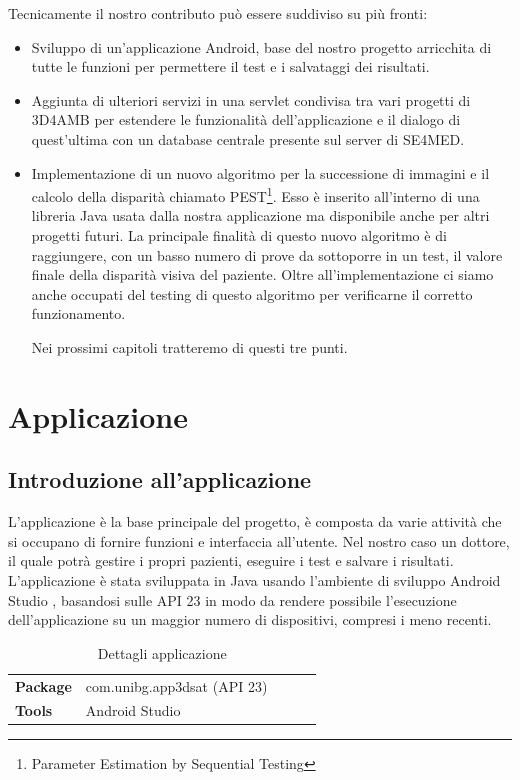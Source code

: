 \documentclass[
	corpo=12pt,
	twoside,
 	evenboxes,
	tipotesi=triennale,
    	stile=classica,
   	 greek,
]{toptesi}
\begin{document}
Tecnicamente il nostro contributo può essere suddiviso su più fronti:
\begin{itemize}
\item Sviluppo di un'applicazione Android, base del nostro progetto arricchita di tutte le funzioni per permettere il test e i salvataggi dei risultati.
\item Aggiunta di ulteriori servizi in una servlet condivisa tra vari progetti di 3D4AMB per estendere le funzionalità dell'applicazione e il dialogo di quest'ultima con un database centrale presente sul server di SE4MED.
\item Implementazione di un nuovo algoritmo per la successione di immagini e il calcolo della disparità chiamato PEST\footnote{Parameter Estimation by Sequential Testing}. Esso è inserito all'interno di una libreria Java usata dalla nostra applicazione ma disponibile anche per altri progetti futuri. La principale finalità di questo nuovo algoritmo è di raggiungere, con un basso numero di prove da sottoporre in un test, il valore finale della disparità visiva del paziente. Oltre all'implementazione ci siamo anche occupati del testing di questo algoritmo per verificarne il corretto funzionamento.

Nei prossimi capitoli tratteremo di questi tre punti.
\end{itemize}

\vfill

\chapter{Applicazione}
\label{chap:applicazione}

\section{Introduzione all'applicazione}
\label{sec:introduzioneallapplicazione}
L'applicazione è la base principale del progetto, è composta da varie attività che si occupano di fornire funzioni e interfaccia all'utente. Nel nostro caso un dottore, il quale potrà gestire i propri pazienti, eseguire i test e salvare i risultati. L'applicazione è stata sviluppata in Java usando l'ambiente di sviluppo Android Studio \cite{androiddevelopers}, basandosi sulle API 23 in modo da rendere possibile l'esecuzione dell'applicazione su un maggior numero di dispositivi, compresi i meno recenti.\\

\begin{table}[]
\centering
\begin{tabular}{lllll}
\toprule
\textbf{Package} &  com.unibg.app3dsat (API 23)\\
\textbf{Tools} & Android Studio\\
\bottomrule
\end{tabular}
\caption{Dettagli applicazione \label{t:1}}
\end{table}
\end{document}
